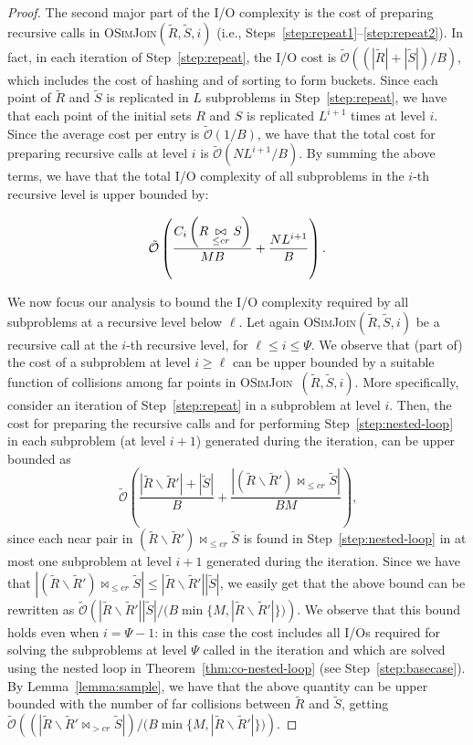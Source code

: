 \documentclass{llncs}
\newcommand{\Osymbol}{{\mathcal O}}
\newcommand{\TO}[1]{\tilde{\Osymbol}\left(#1\right)}
\newcommand{\SimJoin}{\textsc{OSimJoin}}
\begin{document}
\begin{proof}
The second major part of the I/O complexity is the cost of preparing recursive calls in \SimJoin$(\tilde{R},\tilde{S},i)$ (i.e., Steps~\ref{step:repeat1}--\ref{step:repeat2}). 
In fact, in each iteration of Step~\ref{step:repeat}, the I/O cost is $\TO{(|\tilde R|+|\tilde S|)/B}$, which includes the cost of hashing and of sorting to form buckets. 
Since each point of $\tilde R$ and $\tilde S$ is replicated in $L$ subproblems in Step~\ref{step:repeat}, we have that each point of the initial sets $R$ and $S$ is replicated $L^{i+1}$ times at level $i$. 
Since the average cost per entry is $\TO{1/B}$, we have that the total cost for preparing  recursive calls at level
$i$ is $\TO{N L^{i+1}/B}$.
By summing the above terms, we have that the total I/O complexity of all subproblems in the $i$-th recursive level is upper bounded by:

\begin{equation}\label{eq:belowL}
\TO{\frac{\C{R \underset{\leq cr}{\bowtie} S}}{MB} + \frac{NL^{i+1}}{B}}.
\end{equation}

We now focus our analysis to  bound the I/O complexity required by all subproblems at a recursive level below $\ell$.
Let again \SimJoin$(\tilde{R},\tilde{S},i)$ be a recursive call at the $i$-th recursive level, for $\ell \leq i\leq \Psi$.
We observe that (part of) the cost of a subproblem at level $i \geq \ell$ can be upper bounded by a suitable function of collisions among far points in
\SimJoin\ $(\tilde{R},\tilde{S},i)$.
More specifically, consider an iteration of Step~\ref{step:repeat} in a subproblem at level $i$. 
Then, the cost for preparing the recursive calls and for performing Step~\ref{step:nested-loop} in each  subproblem (at level $i+1$) generated during the iteration, can be upper bounded as
\[
\TO{\frac{|\tilde R\backslash \tilde R'|+|\tilde S|}{B}+\frac{|(\tilde
R\backslash \tilde R') \bowtie_{\leq cr}\tilde S|}{BM}}\text{,}\]
since each near pair in $(\tilde R\backslash \tilde R') \bowtie_{\leq cr} \tilde S$ is found in Step~\ref{step:nested-loop} in at most one subproblem at level $i+1$ generated during the iteration. 
Since we have that $|(\tilde R\backslash \tilde R') \bowtie_{\leq cr}\tilde S|\leq |\tilde R\backslash \tilde R'| |\tilde S|$, we easily get that the above bound can be rewritten as $\TO{{|\tilde R\backslash \tilde R'||\tilde S|}/({B \min\{M,|\tilde R\backslash \tilde R'|\})}}$. 
We observe that this bound holds even when $i=\Psi-1$: in this case the cost includes all I/Os required for solving the subproblems at level $\Psi$ called in the iteration and which are solved using the nested loop in Theorem~\ref{thm:co-nested-loop} (see Step~\ref{step:basecase}). 
By Lemma~\ref{lemma:sample}, we have that the above quantity can be upper bounded with the number of far collisions between $\tilde R$ and $\tilde S$, getting $\TO{({|\tilde R\backslash \tilde R' \bowtie_{>cr} \tilde S|})/({B\min\{M,|\tilde R\backslash \tilde R'|\})}}$. 


\end{proof}
\end{document}
